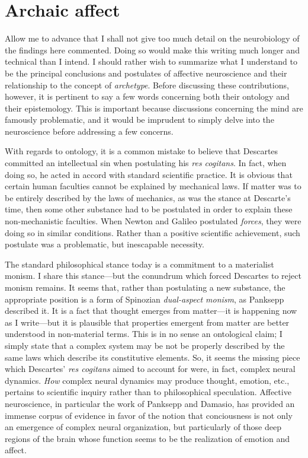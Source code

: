 \documentclass[a4paper]{article}
\begin{document}
\section{Archaic affect}

Allow me to advance that I shall not give too much detail on the neurobiology of
the findings here commented. Doing so would make this writing much
longer and technical than I intend. I should rather wish to summarize what I
understand to be the principal conclusions and postulates of affective
neuroscience and their relationship to the concept of \textit{archetype}. Before
discussing these contributions, however, it is pertinent to say a few words
concerning both their ontology and their epistemology. This is important because
discussions concerning the mind are famously problematic, and it would be
imprudent to simply delve into the neuroscience before addressing a few
concerns.

With regards to ontology, it is a common mistake to believe that Descartes
committed an intellectual sin when postulating his \textit{res cogitans}.
In fact, when doing so, he acted in accord with standard scientific practice. It
is obvious that certain human faculties cannot be explained by mechanical laws.
If matter was to be entirely described by the laws of mechanics, as was the
stance at Descarte's time, then some other substance had to be postulated in
order to explain these non-mechanistic faculties. When Newton and Galileo
postulated \textit{forces}, they were doing so in similar conditions. Rather
than a positive scientific achievement, such postulate was a problematic, but
inescapable necessity.

The standard philosophical stance today is a commitment to a materialist
monism. I share this stance---but the conundrum which forced Descartes to
reject monism remains. It seems that, rather than postulating a new substance,
the appropriate position is a form of Spinozian \textit{dual-aspect monism}, as
Panksepp described it. It is a fact that thought emerges from matter---it is
happening now as I write---but it is plausible that properties emergent from
matter are better understood in non-material terms. This is in no sense an
ontological claim; I simply state that a complex system may be not be properly
described by the same laws which describe its constitutive elements. So, it
seems the missing piece which Descartes' \textit{res cogitans} aimed to account
for were, in fact, complex neural dynamics. \textit{How} complex neural dynamics
may produce thought, emotion, etc., pertains to scientific inquiry rather than
to philosophical speculation. Affective neuroscience, in particular the work of
Panksepp and Damasio, has provided an immense corpus of evidence in favor of the
notion that conciousness is not only an emergence of complex neural
organization, but particularly of those deep regions of the brain whose function
seems to be the realization of emotion and affect.
\end{document}
